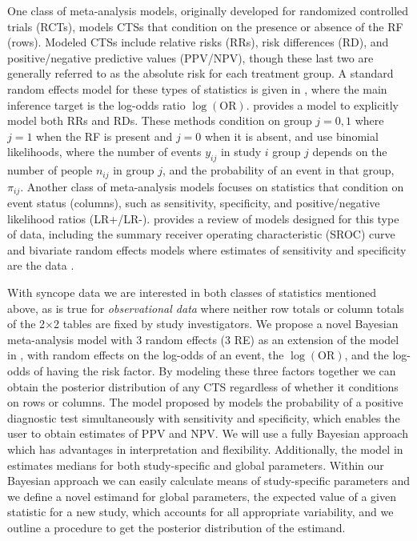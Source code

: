 \documentclass[AMA,STIX1COL]{WileyNJD-v2}
\begin{document}
One class of meta-analysis models, originally developed for randomized controlled trials (RCTs), models CTSs that condition on the presence or absence of the RF (rows). Modeled CTSs include relative risks (RRs), risk differences (RD), and positive/negative predictive values (PPV/NPV), though these last two are generally referred to as the absolute risk for each treatment group. A standard random effects model for these types of statistics is given in \citet{smith1995}, where the main inference target is the log-odds ratio $\log(\mbox{OR})$. \citet{warn2002} provides a model to explicitly model both RRs and RDs. These methods condition on group $j = 0, 1$ where $j=1$ when the RF is present and $j=0$ when it is absent, and use binomial likelihoods, where the number of events $y_{ij}$ in study $i$ group $j$ depends on the number of people $n_{ij}$ in group $j$, and the probability of an event in that group, $\pi_{ij}$. Another class of meta-analysis models focuses on statistics that condition on event status (columns), such as sensitivity, specificity, and positive/negative likelihood ratios (LR+/LR-). \citet{ma2016} provides a review of models designed for this type of data, including the summary receiver operating characteristic (SROC) curve \citep{rutter2001, moses1993} and bivariate random effects models where estimates of sensitivity and specificity are the data \citep{reitsma2005, chu2006, arends2008}. 

With syncope data we are interested in both classes of statistics mentioned above, as is true for \textit{observational data} where neither row totals or column totals of the 2$\times$2 tables are fixed by study investigators. We propose a novel Bayesian meta-analysis model with 3 random effects (3 RE) as an extension of the model in \citet{smith1995}, with random effects on the log-odds of an event, the $\log(\mbox{OR})$, and the log-odds of having the risk factor. By modeling these three factors together we can obtain the posterior distribution of any CTS regardless of whether it conditions on rows or columns. The model proposed by \citet{chu2009} models the probability of a positive diagnostic test simultaneously with sensitivity and specificity, which enables the user to obtain estimates of PPV and NPV. We will use a fully Bayesian approach which has advantages in interpretation and flexibility. Additionally, the model in \citet{chu2009} estimates medians for both study-specific and global parameters. Within our Bayesian approach we can easily calculate means of study-specific parameters and we define a novel estimand for global parameters, the expected value of a given statistic for a new study, which accounts for all appropriate variability, and we outline a procedure to get the posterior distribution of the estimand. 
\end{document}

